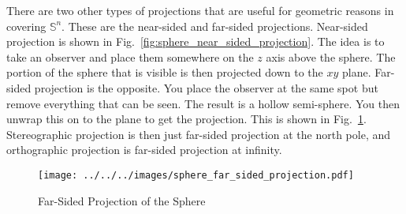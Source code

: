 \documentclass{article}
\theoremstyle{plain}
\theoremstyle{normal}
\begin{document}
        There are two other types of projections that are useful for geometric
        reasons in covering $\mathbb{S}^{n}$. These are the near-sided and
        far-sided projections. Near-sided projection is shown in
        Fig.~\ref{fig:sphere_near_sided_projection}. The idea is to take an
        observer and place them somewhere on the $z$ axis above the sphere.
        The portion of the sphere that is visible is then projected down to the
        $xy$ plane. Far-sided projection is the opposite. You place the
        observer at the same spot but remove everything that can be seen.
        The result is a hollow semi-sphere. You then unwrap this on to the
        plane to get the projection. This is shown in
        Fig.~\ref{fig:sphere_far_sided_projection}. Stereographic projection
        is then just far-sided projection at the north pole, and orthographic
        projection is far-sided projection at infinity.
        \begin{figure}
            \centering
            \texttt{[image: ../../../images/sphere\_far\_sided\_projection.pdf]}
            \caption{Far-Sided Projection of the Sphere}
            \label{fig:sphere_far_sided_projection}
        \end{figure}
\end{document}
